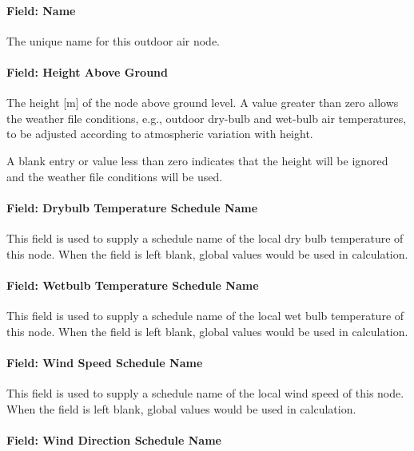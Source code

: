 \paragraph{Field: Name}\label{field-name-5-001}

The unique name for this outdoor air node.

\paragraph{Field: Height Above Ground}\label{field-height-above-ground}

The height {[}m{]} of the node above ground level. A value greater than zero allows the weather file conditions, e.g., outdoor dry-bulb and wet-bulb air temperatures, to be adjusted according to atmospheric variation with height.

A blank entry or value less than zero indicates that the height will be ignored and the weather file conditions will be used.

\paragraph{Field: Drybulb Temperature Schedule Name}\label{field-drybulb-temperature-schedule-name}

This field is used to supply a schedule name of the local dry bulb temperature of this node. When the field is left blank, global values would be used in calculation.

\paragraph{Field: Wetbulb Temperature Schedule Name}\label{field-wetbulb-temperature-schedule-name}

This field is used to supply a schedule name of the local wet bulb temperature of this node. When the field is left blank, global values would be used in calculation.

\paragraph{Field: Wind Speed Schedule Name}\label{field-wind-speed-schedule-name}

This field is used to supply a schedule name of the local wind speed of this node. When the field is left blank, global values would be used in calculation.

\paragraph{Field: Wind Direction Schedule Name}\label{field-wind-dir-schedule-name}

